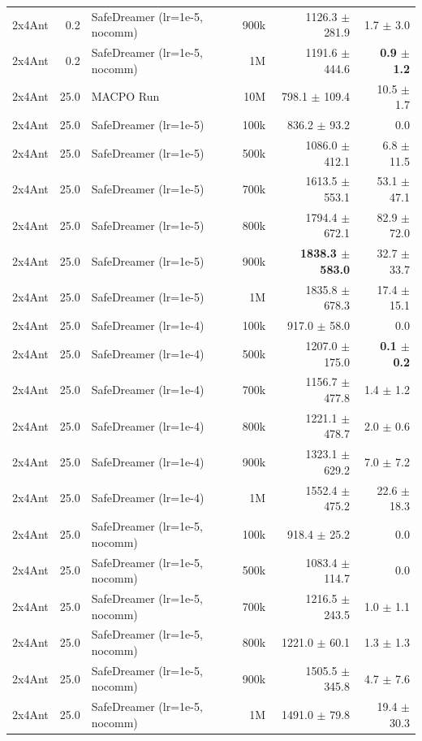 \begin{longtable}{l r l r r r}
2x4Ant & 0.2 & SafeDreamer (lr=1e-5, nocomm) & 900k & 1126.3 $\pm$ 281.9 & 1.7 $\pm$ 3.0 \\
2x4Ant & 0.2 & SafeDreamer (lr=1e-5, nocomm) & 1M & 1191.6 $\pm$ 444.6 & \textbf{0.9 $\pm$ 1.2} \\
\midrule
2x4Ant & 25.0 & MACPO Run & 10M & 798.1 $\pm$ 109.4 & 10.5 $\pm$ 1.7 \\
2x4Ant & 25.0 & SafeDreamer (lr=1e-5) & 100k & 836.2 $\pm$ 93.2 & 0.0 \\
2x4Ant & 25.0 & SafeDreamer (lr=1e-5) & 500k & 1086.0 $\pm$ 412.1 & 6.8 $\pm$ 11.5 \\
2x4Ant & 25.0 & SafeDreamer (lr=1e-5) & 700k & 1613.5 $\pm$ 553.1 & 53.1 $\pm$ 47.1 \\
2x4Ant & 25.0 & SafeDreamer (lr=1e-5) & 800k & 1794.4 $\pm$ 672.1 & 82.9 $\pm$ 72.0 \\
2x4Ant & 25.0 & SafeDreamer (lr=1e-5) & 900k & \textbf{1838.3 $\pm$ 583.0} & 32.7 $\pm$ 33.7 \\
2x4Ant & 25.0 & SafeDreamer (lr=1e-5) & 1M & 1835.8 $\pm$ 678.3 & 17.4 $\pm$ 15.1 \\
2x4Ant & 25.0 & SafeDreamer (lr=1e-4) & 100k & 917.0 $\pm$ 58.0 & 0.0 \\
2x4Ant & 25.0 & SafeDreamer (lr=1e-4) & 500k & 1207.0 $\pm$ 175.0 & \textbf{0.1 $\pm$ 0.2} \\
2x4Ant & 25.0 & SafeDreamer (lr=1e-4) & 700k & 1156.7 $\pm$ 477.8 & 1.4 $\pm$ 1.2 \\
2x4Ant & 25.0 & SafeDreamer (lr=1e-4) & 800k & 1221.1 $\pm$ 478.7 & 2.0 $\pm$ 0.6 \\
2x4Ant & 25.0 & SafeDreamer (lr=1e-4) & 900k & 1323.1 $\pm$ 629.2 & 7.0 $\pm$ 7.2 \\
2x4Ant & 25.0 & SafeDreamer (lr=1e-4) & 1M & 1552.4 $\pm$ 475.2 & 22.6 $\pm$ 18.3 \\
2x4Ant & 25.0 & SafeDreamer (lr=1e-5, nocomm) & 100k & 918.4 $\pm$ 25.2 & 0.0 \\
2x4Ant & 25.0 & SafeDreamer (lr=1e-5, nocomm) & 500k & 1083.4 $\pm$ 114.7 & 0.0 \\
2x4Ant & 25.0 & SafeDreamer (lr=1e-5, nocomm) & 700k & 1216.5 $\pm$ 243.5 & 1.0 $\pm$ 1.1 \\
2x4Ant & 25.0 & SafeDreamer (lr=1e-5, nocomm) & 800k & 1221.0 $\pm$ 60.1 & 1.3 $\pm$ 1.3 \\
2x4Ant & 25.0 & SafeDreamer (lr=1e-5, nocomm) & 900k & 1505.5 $\pm$ 345.8 & 4.7 $\pm$ 7.6 \\
2x4Ant & 25.0 & SafeDreamer (lr=1e-5, nocomm) & 1M & 1491.0 $\pm$ 79.8 & 19.4 $\pm$ 30.3 \\

\end{longtable}
